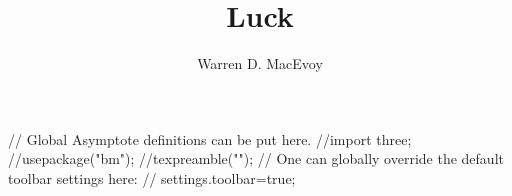 \documentclass{tufte-book} %
\title{Luck} %
\author[W. MacEvoy]{Warren D. MacEvoy} %
\theoremstyle{definition}
\theoremstyle{example}
\theoremstyle{theorem}
\begin{document}
\renewcommand{\allcaps}[1]{\textsmallcaps{#1}}
\renewcommand{\smallcaps}[1]{\textsmallcaps{#1}}
\renewcommand{\allcapsspacing}[1]{#1}
\renewcommand{\smallcapsspacing}[1]{#1}
\renewcommand{\textsc}[1]{\textsmallcaps{#1}}

\def\asydir{graphics}
\begin{asydef}
// Global Asymptote definitions can be put here.
//import three;
//usepackage("bm");
//texpreamble("\def\V#1{\bm{#1}}");
// One can globally override the default toolbar settings here:
// settings.toolbar=true;
\end{asydef}
\frontmatter
\maketitle %

\end{document}
